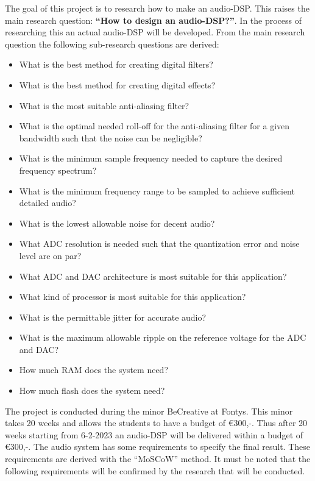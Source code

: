 The goal of this project is to research how to make an audio-DSP. This raises the main research question: \textbf{“How to design an audio-DSP?”}. In the process of researching this an actual audio-DSP will be developed. From the main research question the following sub-research questions are derived:
\begin{itemize} %
	\setlength\itemsep{-0.2em} %
	\item What is the best method for creating digital filters?
	\item What is the best method for creating digital effects?
	\item What is the most suitable anti-aliasing filter?
	\item What is the optimal needed roll-off for the anti-aliasing filter for a given bandwidth such that the noise can be negligible?
	\item What is the minimum sample frequency needed to capture the desired frequency spectrum?
	\item What is the minimum frequency range to be sampled to achieve sufficient detailed audio?
	\item What is the lowest allowable noise for decent audio?
	\item What ADC resolution is needed such that the quantization error and noise level are on par?
	\item What ADC and DAC architecture is most suitable for this application?
	\item What kind of processor is most suitable for this application?
	\item What is the permittable jitter for accurate audio?
	\item What is the maximum allowable ripple on the reference voltage for the ADC and DAC?
	\item How much RAM does the system need?
	\item How much flash does the system need?\\
\end{itemize}


The project is conducted during the minor BeCreative at Fontys. This minor takes 20 weeks and allows the students to have a budget of €300,-. Thus after 20 weeks starting from 6-2-2023 an audio-DSP will be delivered within a budget of €300,-.
The audio system has some requirements to specify the final result. These requirements are derived with the “MoSCoW” method. It must be noted that the following requirements will be confirmed by the research that will be conducted.


